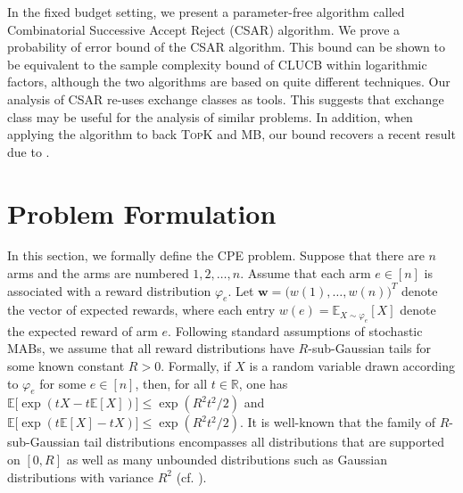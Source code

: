 \documentclass{article}
\newcommand{\wei}[1]{}
\newcommand{\wei}[1]{{\color{blue!50!black}  [\text{Wei:} #1]}}
\newcommand{\junk}[1]{}
\newcommand{\Algorithm}{{\small \textsf{CLUCB}}\xspace}
\newcommand{\AlgorithmBud}{{\small \textsf{CSAR}}\xspace}
\newcommand{\Problem}{{CPE}\xspace}
\newcommand{\Rew}{\varphi}
\newcommand{\E}{\mathbb E}
\newcommand{\RR}{\mathbb R}
\newcommand{\MultiIdent}{\textsc{TopK}\xspace}
\newcommand{\MultiBandit}{\textsc{MB}\xspace}
\renewcommand{\vec}[1]{\boldsymbol{#1}}
\begin{document}
In the fixed budget setting, we present a parameter-free algorithm called Combinatorial Successive Accept Reject (\AlgorithmBud) algorithm.
We prove a probability of error bound of the \AlgorithmBud algorithm. 
This bound can be shown to be equivalent to the sample complexity bound of \Algorithm within logarithmic factors, although the two algorithms are based on quite different techniques. 
Our analysis of \AlgorithmBud re-uses exchange classes as tools. 
This suggests that exchange class may be useful for the analysis of similar problems. 
In addition, when applying the algorithm to back \MultiIdent and \MultiBandit, our bound recovers a recent result due to \citet{bubeck2013multiple}. 

\junk{
\textbf{Useful notations.} Let $[n]$ denote the set $\{1,\ldots,n\}$. Suppose that $\vec w\in \RR^{n}$ is a vector and $E\subseteq[n]$ is a set. 
Let $w(i)$ denote the $i$-th entry of $\vec w$. 
We define $w(E) \triangleq  \sum_{i\in E} w(i)$ to be the sum of entries indexed by $E$.
}
\vspace{-0.7em}
\section{Problem Formulation}
\vspace{-0.7em}
In this section,  we formally define the \Problem problem.
Suppose that there are $n$ arms and the arms are numbered $1,2,\ldots,n$.
Assume that each arm $e\in[n]$ is associated with a reward distribution $\Rew_e$.
Let $\vec w = \big(w(1),\ldots, w(n)\big)^T$ denote the vector of expected rewards, where each entry $w(e)=\E_{X\sim \Rew_e}[X]$ denote the expected reward of arm $e$.
Following standard assumptions of stochastic MABs, we assume that all reward distributions have $R$-sub-Gaussian tails for some known constant $R>0$. 
Formally, if $X$ is a random variable drawn according to $\Rew_e$ for some $e\in[n]$, then, for all $t\in \RR$, one has $\mathbb E\big[\exp(tX-t\mathbb E[X])\big] \le \exp(R^2t^2/2)$ and $\mathbb E\big[\exp(t\mathbb E[X]-tX)\big] \le \exp(R^2t^2/2)$.
It is well-known that the family of $R$-sub-Gaussian tail distributions encompasses all distributions that are supported on $[0,R]$ as well as many unbounded distributions such as Gaussian distributions with variance $R^2$ (cf. \citep{pollard2000asymptopia}).
\end{document}
